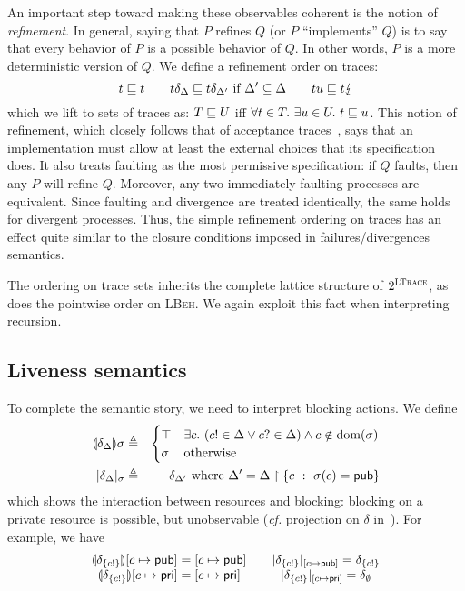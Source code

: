 \documentclass{entcs}
\begin{document}
An important step toward making these observables coherent is the
notion of \emph{refinement}.  In general, saying that $P$ refines $Q$
(or $P$ ``implements'' $Q$) is to say that every behavior of $P$ is a
possible behavior of $Q$.  In other words, $P$ is a more deterministic
version of $Q$.  We define a refinement order on traces:
\[
t \sqsubseteq t \qquad
t\delta_\Delta \sqsubseteq t\delta_{\Delta'}\ \textrm{if}\ \Delta' \subseteq \Delta \qquad
tu \sqsubseteq t\lightning
\]
which we lift to sets of traces as: $T \sqsubseteq U$ iff $\forall t \in
T.\ \exists u\in U.\ t \sqsubseteq u$.  This notion of refinement, which
closely follows that of acceptance traces~\cite{Hennessy2002}, says
that an implementation must allow at least the external choices that
its specification does.  It also treats faulting as the most
permissive specification: if $Q$ faults, then any $P$ will refine $Q$.
Moreover, any two immediately-faulting processes are equivalent.
Since faulting and divergence are treated identically, the same holds
for divergent processes.  Thus, the simple refinement ordering on
traces has an effect quite similar to the closure conditions imposed
in failures/divergences semantics.

The ordering on trace sets inherits the complete lattice structure of
$2^{\textsc{LTrace}}$, as does the pointwise order on \textsc{LBeh}.
We again exploit this fact when interpreting recursion.

\subsection{Liveness semantics}

To complete the semantic story, we need to interpret blocking actions.
We define
\begin{eqnarray*}
 \ASem{\delta_\Delta}{\sigma} &\eqdef& \begin{cases}
      \top & \exists c.\ (c! \in \Delta \vee c? \in \Delta) \wedge c \notin\dom(\sigma) \\
      \sigma & \ow
    \end{cases} \\
  |\delta_\Delta|_\sigma &\eqdef&
    \delta_{\Delta'} \ \textrm{where}\ 
    \Delta' = \Delta\upharpoonright \{c\ :\ \sigma(c) = \pub \}
\end{eqnarray*}
which shows the interaction between resources and blocking: blocking
on a private resource is possible, but unobservable (\emph{cf.}
projection on $\delta$ in~\cite{Brookes2002}).  For example, we have
\[
\begin{array}{c@{\qquad}c}
\ASem{\delta_{\{c!\}}}{[c \mapsto \pub]} = [c \mapsto \pub] &
|\delta_{\{c!\}}|_{[c \mapsto \pub]} = \delta_{\{c!\}}
\\
\ASem{\delta_{\{c!\}}}{[c \mapsto \pri]} = [c \mapsto \pri] &
|\delta_{\{c!\}}|_{[c \mapsto \pri]} = \delta_\emptyset
\end{array}
\]
\end{document}
